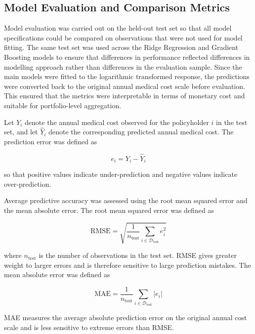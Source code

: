 	\subsection{Model Evaluation and Comparison Metrics}
	
	Model evaluation was carried out on the held-out test set so that all model specifications could be compared on observations that were not used for model fitting. The same test set was used across the Ridge Regression and Gradient Boosting models to ensure that differences in performance reflected differences in modelling approach rather than differences in the evaluation sample. Since the main models were fitted to the logarithmic transformed response, the predictions were converted back to the original annual medical cost scale before evaluation. This ensured that the metrics were interpretable in terms of monetary cost and suitable for portfolio-level aggregation.
	
	Let \(Y_i\) denote the annual medical cost observed for the policyholder \(i\) in the test set, and let \(\hat{Y}_i\) denote the corresponding predicted annual medical cost. The prediction error was defined as
	
	\begin{equation}
		e_i = Y_i - \hat{Y}_i
	\end{equation}
	
	so that positive values indicate under-prediction and negative values indicate over-prediction.
	
	Average predictive accuracy was assessed using the root mean squared error and the mean absolute error. The root mean squared error was defined as
	
	\begin{equation}
		\mathrm{RMSE}
		=
		\sqrt{
			\frac{1}{n_{\mathrm{test}}}
			\sum_{i \in \mathcal{D}_{\mathrm{test}}}
			e_i^2
		}
	\end{equation}
	
	where \(n_{\mathrm{test}}\) is the number of observations in the test set. RMSE gives greater weight to larger errors and is therefore sensitive to large prediction mistakes. The mean absolute error was defined as
	
	\begin{equation}
		\mathrm{MAE}
		=
		\frac{1}{n_{\mathrm{test}}}
		\sum_{i \in \mathcal{D}_{\mathrm{test}}}
		\left| e_i \right|
	\end{equation}
	
	MAE measures the average absolute prediction error on the original annual cost scale and is less sensitive to extreme errors than RMSE.
	
